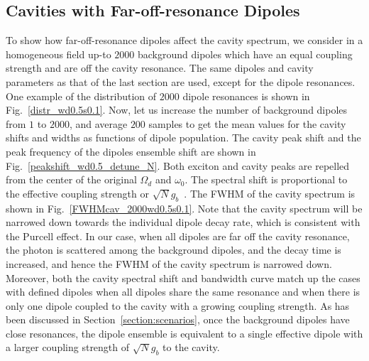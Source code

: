 \subsection{Cavities with Far-off-resonance Dipoles}
To show how far-off-resonance dipoles affect the cavity spectrum, we consider in a homogeneous field up-to $2000$ background dipoles which have an equal coupling strength and are off the cavity resonance. The same dipoles and cavity parameters as that of the last section are used, except for the dipole resonances. One example of the distribution of $2000$ dipole resonances is shown in Fig.~\ref{distr_wd0.5s0.1}. Now, let us increase the number of background dipoles from $1$ to $2000$, and average $200$ samples to get the mean values for the cavity shifts and widths as functions of dipole population. The cavity peak shift and the peak frequency of the dipoles ensemble shift are shown in Fig.~\ref{peakshift_wd0.5_detune_N}. Both exciton and cavity peaks are repelled from the center of the original $\Omega_d$ and $\omega_0$. The spectral shift is proportional to the effective coupling strength or $\sqrt{N}g_b$~\cite{Kimble1994}. The FWHM of the cavity spectrum is shown in Fig.~\ref{FWHMcav_2000wd0.5s0.1}. Note that the cavity spectrum will be narrowed down towards the individual dipole decay rate, which is consistent with the Purcell effect. In our case, when all dipoles are far off the cavity resonance, the photon is scattered among the background dipoles, and the decay time is increased, and hence the FWHM of the cavity spectrum is narrowed down. Moreover, both the cavity spectral shift and bandwidth curve match up the cases with defined dipoles when all dipoles share the same resonance and when there is only one dipole coupled to the cavity with a growing coupling strength. As has been discussed in Section~\ref{section:scenarios}, once the background dipoles have close resonances, the dipole ensemble is equivalent to a single effective dipole with a larger coupling strength of $\sqrt{N}g_b$ to the cavity.


